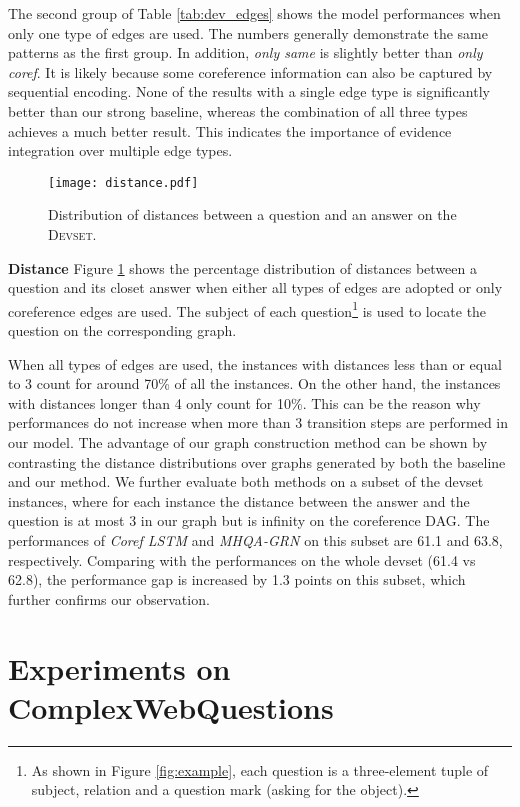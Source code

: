 \documentclass[letterpaper]{article}
\begin{document}
The second group of Table \ref{tab:dev_edges} shows the model performances when only one type of edges are used.
The numbers generally demonstrate the same patterns as the first group.
In addition, \emph{only same} is slightly better than \emph{only coref}.
It is likely because some coreference information can also be captured by sequential encoding.
None of the results with a single edge type is significantly better than our strong baseline, whereas the combination of all three types achieves a much better result. 
This indicates the importance of evidence integration over multiple edge types.


\begin{figure}
\centering
\texttt{[image: distance.pdf]}
\caption{Distribution of distances between a question and an answer on the \textsc{Devset}.}
\label{fig:dist}
\end{figure}


\vspace{0.5em}
\textbf{Distance}
Figure \ref{fig:dist} shows the percentage distribution of distances between a question and its closet answer when either all types of edges are adopted or only coreference edges are used.
The subject of each question\footnote{As shown in Figure \ref{fig:example}, each question is a three-element tuple of subject, relation and a question mark (asking for the object).} is used to locate the question on the corresponding graph.


When all types of edges are used, the instances with distances less than or equal to 3 count for around 70\% of all the instances. 
On the other hand, the instances with distances longer than 4 only count for 10\%.
This can be the reason why performances do not increase when more than 3 transition steps are performed in our model.
The advantage of our graph construction method can be shown by contrasting the distance distributions over graphs generated by both the baseline and our method.
We further evaluate both methods on a subset of the devset instances, where for each instance the distance between the answer and the question is at most 3 in our graph but is infinity on the coreference DAG.
The performances of \emph{Coref LSTM} and \emph{MHQA-GRN} on this subset are 61.1 and 63.8, respectively.
Comparing with the performances on the whole devset (61.4 vs 62.8), the performance gap is increased by 1.3 points on this subset, which further confirms our observation.


\section{Experiments on ComplexWebQuestions}
\end{document}
